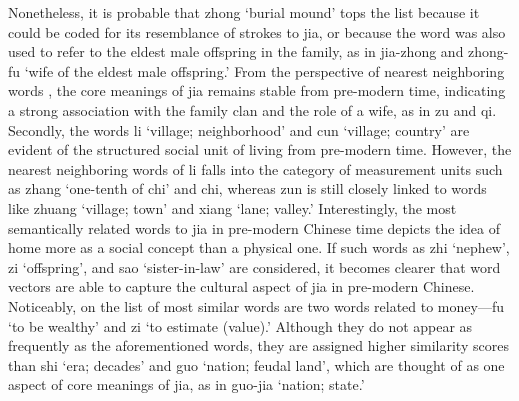 Nonetheless, it is probable that zhong `burial mound' tops the list because it could be coded for its resemblance of strokes to jia, or because the word was also used to refer to the eldest male offspring in the family, as in jia-zhong and zhong-fu `wife of the eldest male offspring.' From the perspective of nearest neighboring words \parencite{hamilton2016cultural}, the core meanings of jia remains stable from pre-modern time, indicating a strong association with the family clan and the role of a wife, as in zu and qi. Secondly, the words li `village; neighborhood' and cun `village; country' are evident of the structured social unit of living from pre-modern time. However, the nearest neighboring words of li falls into the category of measurement units such as zhang `one-tenth of chi' and chi, whereas zun is still closely linked to words like zhuang `village; town' and xiang `lane; valley.' Interestingly, the most semantically related words to jia in pre-modern Chinese time depicts the idea of home more as a social concept than a physical one. If such words as zhi `nephew', zi `offspring', and sao `sister-in-law' are considered, it becomes clearer that word vectors are able to capture the cultural aspect of jia in pre-modern Chinese. 
Noticeably, on the list of most similar words are two words related to money—fu `to be wealthy' and zi `to estimate (value).' Although they do not appear as frequently as the aforementioned words, they are assigned higher similarity scores than shi `era; decades' and guo `nation; feudal land', which are thought of as one aspect of core meanings of jia, as in guo-jia `nation; state.'

